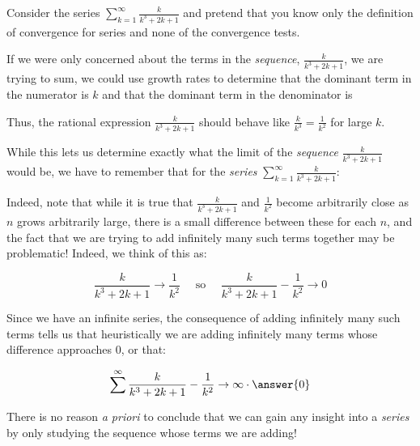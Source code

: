 \documentclass{ximera}
\author{Jim Talamo}
\begin{document}
\begin{exercise}

Consider the series $\sum_{k=1}^{\infty} \frac{k}{k^3+2k+1}$ and pretend that you know only the definition of convergence for series and none of the convergence tests.  

If we were only concerned about the terms in the \emph{sequence}, $\frac{k}{k^3+2k+1}$, we are trying to sum, we could use growth rates to determine that the dominant term in the numerator is $k$ and that the dominant term in the denominator is

\begin{multipleChoice}
\end{multipleChoice}

Thus, the rational expression $\frac{k}{k^3+2k+1}$ should behave like $\frac{k}{k^3} = \frac{1}{k^2}$ for large $k$.  

While this lets us determine exactly what the limit of the \emph{sequence} $\frac{k}{k^3+2k+1}$ would be, we have to remember that for the \emph{series} $\sum_{k=1}^{\infty} \frac{k}{k^3+2k+1}$:

\begin{multipleChoice}
\end{multipleChoice}

Indeed, note that while it is true that $\frac{k}{k^3+2k+1} $ and $\frac{1}{k^2}$ become arbitrarily close as $n$ grows arbitrarily large, there is a small difference between these for each $n$, and the fact that we are trying to add infinitely many such terms together may be problematic!  Indeed, we think of this as:

\[
\frac{k}{k^3+2k+1} \to \frac{1}{k^2} \quad \textrm{ so } \quad \frac{k}{k^3+2k+1} - \frac{1}{k^2} \to 0  
\]

Since we have an infinite series, the consequence of adding infinitely many such terms tells us that heuristically we are adding infinitely many terms whose difference approaches $0$, or that:

\[
\sum^{\infty} \frac{k}{k^3+2k+1} - \frac{1}{k^2} \to \infty \cdot \answer{0}  
\]

There is no reason \emph{a priori} to conclude that we can gain any insight into a \emph{series} by only studying the sequence whose terms we are adding!  


\end{exercise}
\end{document}
